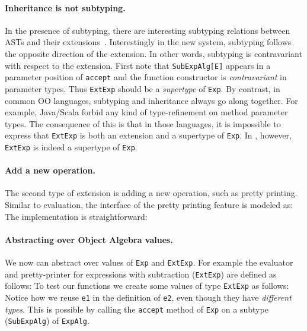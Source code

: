 \paragraph{Inheritance is not subtyping.} In the presence of subtyping, there
are interesting subtyping relations between ASTs and their
extensions~\cite{oliveira09modular}. Interestingly in the new system, subtyping
follows the opposite direction of the extension. In other words, subtyping is
contravariant with respect to the extension. First note that
\lstinline{SubExpAlg[E]} appears in a parameter position of \lstinline{accept}
and the function constructor is \textit{contravariant} in parameter types. Thus
\lstinline{ExtExp} should be a \textit{supertype} of \lstinline{Exp}. By
contrast, in common OO languages, subtyping and inheritance always go along
together. For example, Java/Scala forbid any kind of type-refinement on method
parameter types. The consequence of this is that in those languages, it is
impossible to express that \lstinline{ExtExp} is both an extension and a
supertype of \lstinline{Exp}. In \name, however, \lstinline{ExtExp} is indeed a supertype
of \lstinline{Exp}.

\paragraph{Add a new operation.} The second type of extension is adding a new
operation, such as pretty printing. Similar to evaluation, the interface of the
pretty printing feature is modeled as:
The implementation is straightforward:

\paragraph{Abstracting over Object Algebra values.} We now can abstract over
values of \lstinline{Exp} and \lstinline{ExtExp}. For example the evaluator and
pretty-printer for expressions with subtraction (\lstinline{ExtExp}) are defined
as follows:
To test our functions we create some values of type \lstinline{ExtExp} as
follows:
Notice how we reuse \lstinline{e1} in the definition of
\lstinline{e2}, even though they have \emph{different types}. This is
possible by calling the \lstinline{accept}
method of \lstinline{Exp} on a subtype (\lstinline{SubExpAlg})
of \lstinline{ExpAlg}.

